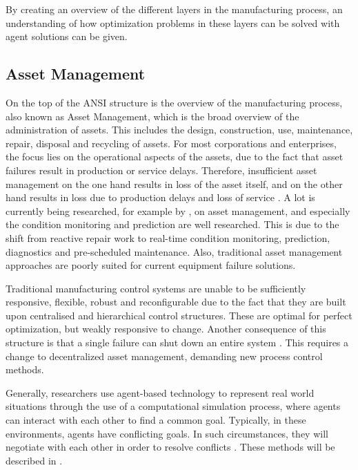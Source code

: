 By creating an overview of the different layers in the manufacturing process, an understanding of how optimization problems in these layers can be solved with agent solutions can be given.



\subsection{Asset Management}
On the top of the ANSI structure is the overview of the manufacturing process, also known as Asset Management, which is the broad overview of the administration of assets. This includes the design, construction, use, maintenance, repair, disposal and recycling of assets. For most corporations and enterprises, the focus lies on the operational aspects of the assets, due to the fact that asset failures result in production or service delays. Therefore, insufficient asset management on the one hand results in loss of the asset itself, and on the other hand results in loss due to production delays and loss of service \citep{trappey2013multi}.  A lot is currently being researched, for example by \citet{leitao2009agent}, on asset management, and  especially the condition monitoring and prediction are well researched. This is due to the shift from reactive repair work to real-time condition monitoring, prediction, diagnostics and pre-scheduled maintenance. Also, traditional asset management approaches are poorly suited for current equipment failure solutions. %
	
Traditional manufacturing control systems are unable to be sufficiently responsive, flexible, robust and reconfigurable due to the fact that they are built upon centralised and hierarchical control structures. These are optimal for perfect optimization, but weakly responsive to change. Another consequence of this structure is that a single failure can shut down an entire system \citep{leitao2009agent}. This requires a change to decentralized asset management, demanding new process control methods. 
	
Generally, researchers use agent-based technology to represent real world situations through the use of a computational simulation process, where agents can interact with each other to find a common goal. Typically, in these environments, agents have conflicting goals. In such circumstances, they will negotiate with each other in order to resolve conflicts \citep{rosa2009intelligent}. These methods will be described in .
		
